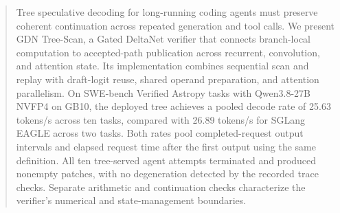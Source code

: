 \begin{abstract}
Tree speculative decoding for long-running coding agents must preserve coherent continuation across repeated generation and tool calls. We present GDN Tree-Scan, a Gated DeltaNet verifier that connects branch-local computation to accepted-path publication across recurrent, convolution, and attention state. Its implementation combines sequential scan and replay with draft-logit reuse, shared operand preparation, and attention parallelism. On SWE-bench Verified Astropy tasks with Qwen3.8-27B NVFP4 on GB10, the deployed tree achieves a pooled decode rate of 25.63 tokens/s across ten tasks, compared with 26.89 tokens/s for SGLang EAGLE across two tasks. Both rates pool completed-request output intervals and elapsed request time after the first output using the same definition. All ten tree-served agent attempts terminated and produced nonempty patches, with no degeneration detected by the recorded trace checks. Separate arithmetic and continuation checks characterize the verifier's numerical and state-management boundaries.
\end{abstract}
